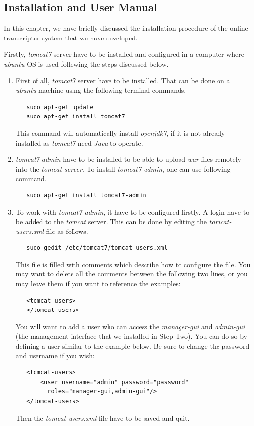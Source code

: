 \documentclass[12pt,oneside,openany,a4paper]{book}
\begin{document}
\begin{appendices}


\chapter{Installation and User Manual}

In this chapter, we have briefly discussed the installation procedure of the online transcriptor system that we have developed.

Firstly, \emph{tomcat7} server have to be installed and configured in a computer where \emph{ubuntu} OS is used following the steps discussed below.

\begin{enumerate}[label=\roman*)]
\item{First of all, \emph{tomcat7} server have to be installed. That can be done on a \emph{ubuntu}  machine using the following terminal commands. 
\begin{lstlisting}
   sudo apt-get update
   sudo apt-get install tomcat7
\end{lstlisting}
This command will automatically install \emph{openjdk7}, if it is not already installed as \emph{tomcat7} need \emph{Java} to operate. }
\item{\emph{tomcat7-admin} have to be installed to be able to upload \emph{war} files remotely into the \emph{tomcat server}. To install \emph{tomcat7-admin}, one can use following command.
\begin{lstlisting}
   sudo apt-get install tomcat7-admin
\end{lstlisting}
}
\item{
To work with \emph{tomcat7-admin}, it have to be configured firstly. A login have to be added to the \emph{tomcat} server. This can be done by editing the \emph{tomcat-users.xml} file as follows.
\begin{lstlisting}
   sudo gedit /etc/tomcat7/tomcat-users.xml
\end{lstlisting}
This file is filled with comments which describe how to configure the file. You may want to delete all the comments between the following two lines, or you may leave them if you want to reference the examples:
\begin{lstlisting}
   <tomcat-users>
   </tomcat-users>
\end{lstlisting}
You will want to add a user who can access the \emph{manager-gui} and \emph{admin-gui} (the management interface that we installed in Step Two). You can do so by defining a user similar to the example below. Be sure to change the password and username if you wish:
\begin{lstlisting}
   <tomcat-users>
       <user username="admin" password="password" 
         roles="manager-gui,admin-gui"/>
   </tomcat-users>
\end{lstlisting}
Then the \emph{tomcat-users.xml} file have to be saved and quit.
}


\end{enumerate}
\end{appendices}
\end{document}
